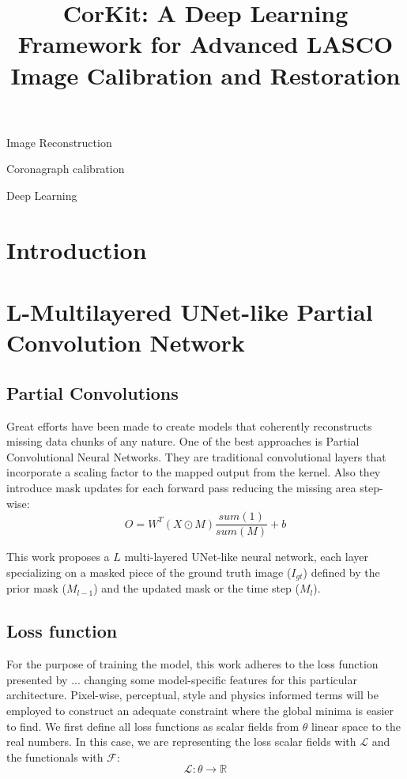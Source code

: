 \documentclass[draft]{agujournal2019}
\begin{document}
\title{CorKit: A Deep Learning Framework for Advanced LASCO Image Calibration and Restoration}


\begin{keypoints}
\item Image Reconstruction
\item Coronagraph calibration
\item Deep Learning
\end{keypoints}

\begin{abstract}
\end{abstract}

\section{Introduction}

\section{L-Multilayered UNet-like Partial Convolution Network}

\subsection{Partial Convolutions}
Great efforts have been made to create models that coherently reconstructs missing data chunks of any nature. One of the best approaches is Partial Convolutional Neural Networks. They are traditional convolutional layers that incorporate a scaling factor to the mapped output from the kernel. Also they introduce mask updates for each forward pass reducing the missing area step-wise:
\begin{equation}
    O = W^T(X \odot M)\frac{sum(1)}{sum(M)} + b
\end{equation}

This work proposes a $L$ multi-layered UNet-like neural network, each layer specializing on a masked piece of the ground truth image ($I_{gt}$) defined by the prior mask ($M_{l-1}$) and the updated mask or the time step ($M_{l}$).
\subsection{Loss function}
For the purpose of training the model, this work adheres to the loss function presented by ... changing some model-specific features for this particular architecture. Pixel-wise, perceptual, style and physics informed terms will be employed to construct an adequate constraint where the global minima is easier to find. We first define all loss functions as scalar fields from \textbf{$\theta$} linear space to the real numbers. In this case, we are representing the loss scalar fields with $\mathcal{L}$ and the functionals with $\boldsymbol{\mathcal{F}}$:
\begin{equation}
    \mathcal{L} : \theta \to \mathbb{R}
\end{equation}
\end{document}

